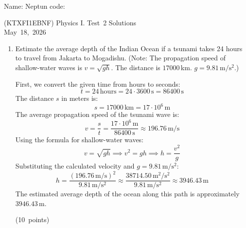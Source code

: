 \documentclass[12pt]{letter}
\begin{document}
Name: \hrulefill \quad Neptun code: \hrulefill

\begin{center}
(KTXFI1EBNF) Physics I. Test~2 Solutions \\
May~18,~2026 
\end{center}

\bigskip

\begin{enumerate}
\setcounter{enumi}{0}

\item Estimate the average depth of the Indian Ocean if a tsunami takes 24 hours to travel from Jakarta to Mogadishu. (Note: The propagation speed of shallow-water waves is $v=\sqrt{gh}$. The distance is $17000$\,km. $g=9.81\,\mathrm{m/s^{2}}.$)


\begin{center}
\end{center}

First, we convert the given time from hours to seconds:
$$t = 24\,\mathrm{hours} = 24 \cdot 3600\,\mathrm{s} = 86400\,\mathrm{s}$$
The distance $s$ in meters is:
$$s = 17000\,\mathrm{km} = 17 \cdot 10^6\,\mathrm{m}$$
The average propagation speed of the tsunami wave is:
$$v = \frac{s}{t} = \frac{17 \cdot 10^6\,\mathrm{m}}{86400\,\mathrm{s}} \approx 196.76\,\mathrm{m/s}$$
Using the formula for shallow-water waves:
$$v = \sqrt{gh} \implies v^2 = gh \implies h = \frac{v^2}{g}$$
Substituting the calculated velocity and $g = 9.81\,\mathrm{m/s^2}$:
$$h = \frac{(196.76\,\mathrm{m/s})^2}{9.81\,\mathrm{m/s^2}} \approx \frac{38714.50\,\mathrm{m^2/s^2}}{9.81\,\mathrm{m/s^2}} \approx 3946.43\,\mathrm{m}$$
The estimated average depth of the ocean along this path is approximately $3946.43\,\mathrm{m}$.

\hfill (10~points)



\end{enumerate}
\end{document}
